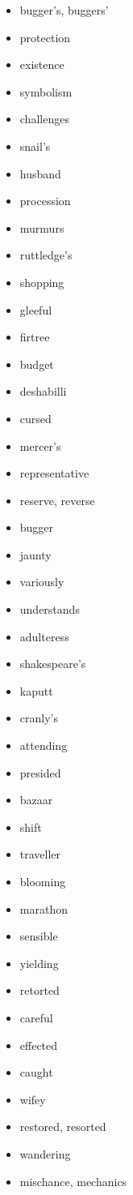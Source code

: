 \documentclass{article}
\begin{document}
\begin{itemize}
    \item bugger's, buggers'
    \item protection
    \item existence
    \item symbolism
    \item challenges
    \item snail's
    \item husband
    \item procession
    \item murmurs
    \item ruttledge's
    \item shopping
    \item gleeful
    \item firtree
    \item budget
    \item deshabilli
    \item cursed
    \item mercer's
    \item representative
    \item reserve, reverse
    \item bugger
    \item jaunty
    \item variously
    \item understands
    \item adulteress
    \item shakespeare's
    \item kaputt
    \item cranly's
    \item attending
    \item presided
    \item bazaar
    \item shift
    \item traveller
    \item blooming
    \item marathon
    \item sensible
    \item yielding
    \item retorted
    \item careful
    \item effected
    \item caught
    \item wifey
    \item restored, resorted
    \item wandering
    \item mischance, mechanics

\end{itemize}
\end{document}
